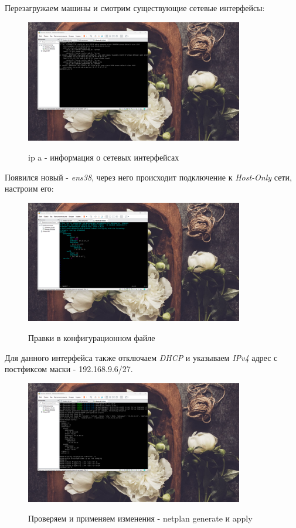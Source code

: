 \documentclass[a4paper]{article}
\begin{document}
  Перезагружаем машины и смотрим существующие сетевые интерфейсы:

  \begin{figure}[H]
    \centering
    \includegraphics[width=0.85\textwidth]{06_00 (52)}
    \label{img:52}
    \caption{ip a - информация о сетевых интерфейсах}
  \end{figure}

  Появился новый - \textit{ens38}, через него происходит подключение к \textit{Host-Only} сети,
  настроим его:
  
  \begin{figure}[H]
    \centering
    \includegraphics[width=0.85\textwidth]{06_00 (53)}
    \label{img:53}
    \caption{Правки в конфигурационном файле}
  \end{figure}
  
  Для данного интерфейса также отключаем \textit{DHCP} и указываем \textit{IPv4} адрес 
  с постфиксом маски - 192.168.9.6/27.

  \begin{figure}[H]
    \centering
    \includegraphics[width=0.85\textwidth]{06_00 (54)}
    \label{img:54}
    \caption{Проверяем и применяем изменения - netplan generate и apply}
  \end{figure}
  
\end{document}
